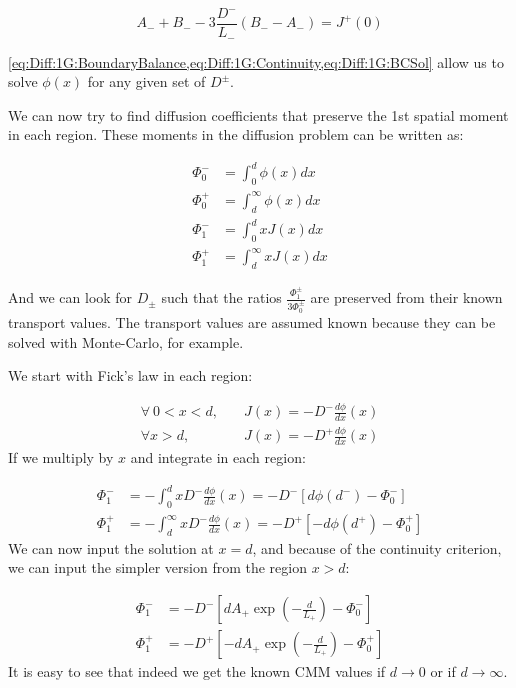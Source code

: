 \documentclass[a4paper,letterpaper,12pt,oneside,draft]{article}
\newcommand{\fst}{1st }
\begin{document}
    \begin{equation}
    \label{eq:Diff:1G:BCSol}
        A_- + B_- -3\frac{D^-}{L_-}(B_--A_-) = J^+(0)
    \end{equation}
    
    \cref{eq:Diff:1G:BoundaryBalance,eq:Diff:1G:Continuity,eq:Diff:1G:BCSol} allow us to solve $\phi(x)$ for any given set of $D^\pm$.
    
    We can now try to find diffusion coefficients that preserve the \fst spatial moment in each region. These moments in the diffusion problem can be written as:
    
    \begin{align}
    \Phi_0^- & = \int_0^d\phi(x)dx \\
    \Phi_0^+ & = \int_d^\infty\phi(x)dx \\
    \Phi_1^- & = \int_0^d xJ(x)dx \\
    \Phi_1^+ & = \int_d^\infty xJ(x)dx
    \end{align}
    
    And we can look for $D_\pm$ such that the ratios $\frac{\Phi_1^\pm}{3\Phi_0^\pm}$ are preserved from their known transport values. The transport values are assumed known because they can be solved with Monte-Carlo, for example.
    
    We start with Fick's law in each region:
    
    \begin{align}
    \label{eq:Fick:x<d}
        \forall\  0<x<d,&\quad J(x) = -D^-\frac{d\phi}{dx}(x) \\
    \label{eq:Fick:x>d}
        \forall x>d,&\quad J(x) = -D^+\frac{d\phi}{dx}(x)
    \end{align}
    If we multiply by $x$ and integrate in each region:
    
    \begin{align}
    \label{eq:Moment1:x<d}
        \Phi_1^- & = -\int_0^d xD^-\frac{d\phi}{dx}(x) = -D^-\left[d\phi(d^-) - \Phi_0^-\right] \\
    \label{eq:Moment1:x>d}
        \Phi_1^+ & = -\int_d^\infty xD^-\frac{d\phi}{dx}(x) = -D^+\left[-d\phi(d^+) - \Phi_0^+ \right]
    \end{align}
    We can now input the solution at $x=d$, and because of the continuity criterion, we can input the simpler version from the region $x>d$:
    
    \begin{align}
    \label{eq:Moment1:x<d:sim}
    \Phi_1^- & = -D^-\left[dA_+\exp\left(-\frac{d}{L_+}\right) - \Phi_0^-\right] \\
    \label{eq:Moment1:x>d:sim}
    \Phi_1^+ & = -D^+\left[-dA_+\exp\left(-\frac{d}{L_+}\right) - \Phi_0^+ \right]
    \end{align}
    It is easy to see that indeed we get the known CMM values if $d\to0$ or if $d\to\infty$.
    
\end{document}
